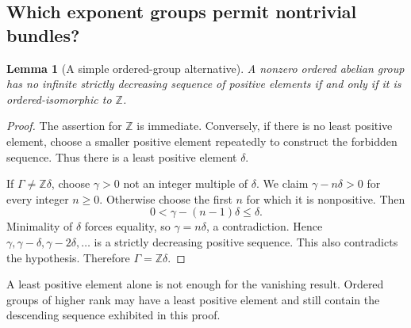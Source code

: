 \documentclass[11pt,letterpaper]{article}
\newtheorem{lemma}[theorem]{Lemma}
\theoremstyle{definition}
\theoremstyle{remark}
\newcommand{\Z}{\mathbb Z}
\numberwithin{equation}{section}
\begin{document}
\subsection{Which exponent groups permit nontrivial bundles?}
\begin{lemma}[A simple ordered-group alternative]\label{lem:groupalternative}
A nonzero ordered abelian group has no infinite strictly decreasing sequence of positive elements if and only if it is ordered-isomorphic to $\Z$.
\end{lemma}
\begin{proof}
The assertion for $\Z$ is immediate. Conversely, if there is no least positive element, choose a smaller positive element repeatedly to construct the forbidden sequence. Thus there is a least positive element $\delta$.

If $\Gamma\ne\Z\delta$, choose $\gamma>0$ not an integer multiple of $\delta$. We claim $\gamma-n\delta>0$ for every integer $n\ge0$. Otherwise choose the first $n$ for which it is nonpositive. Then
\[
 0<\gamma-(n-1)\delta\le\delta.
\]
Minimality of $\delta$ forces equality, so $\gamma=n\delta$, a contradiction. Hence $\gamma,\gamma-\delta,\gamma-2\delta,\ldots$ is a strictly decreasing positive sequence. This also contradicts the hypothesis. Therefore $\Gamma=\Z\delta$.
\end{proof}
A least positive element alone is not enough for the vanishing result. Ordered groups of higher rank may have a least positive element and still contain the descending sequence exhibited in this proof.
\end{document}
